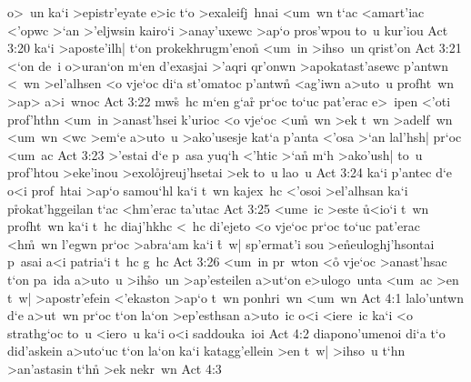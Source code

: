 o>~un
ka`i
>epistr'eyate
e>ic
t`o
>exaleifj~hnai
<um~wn
t`ac
<amart'iac
<'opwc
>`an
>'eljwsin
kairo`i
>anay'uxewc
>ap`o
pros'wpou
to~u
kur'iou\bibvsend
\vs Act 3:20
ka`i
>aposte'ilh|
t`on
prokekhrugm'enon\r{}
<um~in
>ihso~un
qrist'on\bibvsend
\vs Act 3:21
<`on
de~i
o>uran`on
m`en
d'exasjai
>'aqri
qr'onwn
>apokatast'asewc
p'antwn
<~wn
>el'alhsen
<o
vje`oc
di`a
st'omatoc
p'antwn\r{}
<ag'iwn
a>uto~u
profht~wn
>ap>
a>i~wnoc\bibvsend
\vs Act 3:22
mw\r{s}~hc
m`en
g`ar\r{}
pr`oc
to`uc
pat'erac
e>~ipen
<'oti
prof'hthn
<um~in
>anast'hsei
k'urioc
<o
vje`oc
<u\r{m}~wn
>ek
t~wn
>adelf~wn
<um~wn
<wc
>em`e
a>uto~u
>ako'usesje
kat`a
p'anta
<'osa
>`an
lal'hsh|
pr`oc
<um~ac\bibvsend
\vs Act 3:23
>'estai
d`e
p~asa
yuq`h
<'htic
>`a\r{n}
m`h
>ako'ush|
to~u
prof'htou
>eke'inou
>exol\r{o}jreuj'hsetai
>ek
to~u
lao~u\bibvsend
\vs Act 3:24
ka`i
p'antec
d`e
o<i
prof~htai
>ap`o
samou`hl
ka`i
t~wn
kajex~hc
<'osoi
>el'alhsan
ka`i
p\r{r}okat'hggeilan
t`ac
<hm'erac
ta'utac\bibvsend
\vs Act 3:25
<ume~ic
>este
\r{u}<io`i
t~wn
profht~wn
ka`i
t~hc
diaj'hkhc
<~hc
di'ejeto
<o
vje`oc
pr`oc
to`uc
pat'erac
<h\r{m}~wn
l'egwn
pr`oc
>abra`am
ka`i
\r{t}~w|
sp'ermat'i
sou
>e\r{n}euloghj'hsontai
p~asai
a<i
patria`i
t~hc
g~hc\bibvsend
\vs Act 3:26
<um~in
pr~wton
<o\r{}
vje`oc
>anast'hsac
t`on
pa~ida
a>uto~u
>ih\r{s}o~un
>ap'esteilen
a>ut`on
e>ulogo~unta
<um~ac
>en
t~w|
>apostr'efein
<'ekaston
>ap`o
t~wn
ponhri~wn
<um~wn\bibvsend
\vs Act 4:1
lalo'untwn
d`e
a>ut~wn
pr`oc
t`on
la`on
>ep'esthsan
a>uto~ic
o<i
<iere~ic
ka`i
<o
strathg`oc
to~u
<iero~u
ka`i
o<i
saddouka~ioi\bibvsend
\vs Act 4:2
diapono'umenoi
di`a
t`o
did'askein
a>uto`uc
t`on
la`on
ka`i
katagg'ellein
>en
t~w|
>ihso~u
t`hn
>an'astasin
t`hn\r{}
>ek
nekr~wn\bibvsend
\vs Act 4:3
